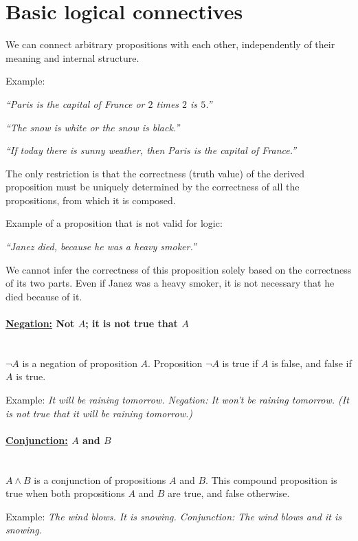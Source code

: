\documentclass[11pt,paper=b5,footinclude,headinclude]{scrbook} %
\theoremstyle{remark}
\theoremstyle{definition} %
\theoremstyle{theorem} %
\begin{document}
\section{Basic logical connectives}

We can connect arbitrary propositions with each other, independently of their meaning and internal structure.

Example:

{\em ``Paris is the capital of France or $2$ times $2$ is $5$.''~}

{\em ``The snow is white or the snow is black.''}

{\em ``If today there is sunny weather, then Paris is the capital of France.''}

\medskip
The only restriction is that the correctness (truth value) of the derived proposition must be
uniquely determined by the correctness of all the propositions, from which it is composed.

Example of a proposition that is not valid for logic:

{\em ``Janez died, because he was a heavy smoker.''}

We cannot infer the correctness of this proposition solely based on the correctness
of its two parts. Even if Janez was a heavy smoker, it is not necessary that he died because of it.

\medskip
\paragraph{ \underline{Negation:} 
Not $A$; it is not true that $A$}
\mbox{}\\

$\neg A$ is a negation of proposition $A$. Proposition $\neg A$ is true if $A$ is false, and false if $A$ is true.

Example: {\em It will be raining tomorrow. Negation: It won't be raining tomorrow. (It is not true that it will be raining tomorrow.)}

\medskip
\paragraph{\underline{Conjunction:} $A$ and $B$}
\mbox{}\\

$A\wedge B$ is a conjunction of propositions $A$ and $B$.
This compound proposition is true
when both propositions $A$ and $B$ are true, and false otherwise.

Example: {\em The wind blows. It is snowing. Conjunction: The wind blows and it is snowing.}
\end{document}
